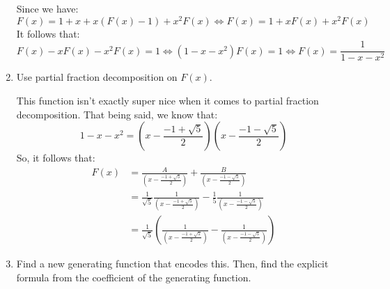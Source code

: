 \documentclass[letterpaper]{article}
\begin{document}
\begin{enumerate}[(1)]
    Since we have:
    \[F(x) = 1 + x + x(F(x) - 1) + x^2 F(x) \iff F(x) = 1 + xF(x) + x^2 F(x)\]
    It follows that:
    \[F(x) - xF(x) - x^2 F(x) = 1 \iff (1 - x - x^2)F(x) = 1 \iff F(x) = \boxed{\frac{1}{1 - x - x^2}}\]

    \item Use partial fraction decomposition on $F(x)$. 
    
    \bigskip 

    This function isn't exactly super nice when it comes to partial fraction decomposition. That being said, we know that:
    \[1 - x - x^2 = \left(x - \frac{-1 + \sqrt{5}}{2}\right)\left(x - \frac{-1 - \sqrt{5}}{2}\right)\]
    So, it follows that:
    \begin{equation*}
        \begin{aligned}
            F(x) &= \frac{A}{\left(x - \frac{-1 + \sqrt{5}}{2}\right)} + \frac{B}{\left(x - \frac{-1 - \sqrt{5}}{2}\right)} \\ 
                &= \frac{1}{\sqrt{5}} \frac{1}{\left(x - \frac{-1 + \sqrt{5}}{2}\right)} - \frac{1}{5} \frac{1}{\left(x - \frac{-1 - \sqrt{5}}{2}\right)} \\ 
                &= \frac{1}{\sqrt{5}} \left(\frac{1}{\left(x - \frac{-1 + \sqrt{5}}{2}\right)} - \frac{1}{\left(x - \frac{-1 - \sqrt{5}}{2}\right)}\right)
        \end{aligned}
    \end{equation*}

    \item Find a new generating function that encodes this. Then, find the explicit formula from the coefficient of the generating function. 
    
    \bigskip 


\end{enumerate}
\end{document}
